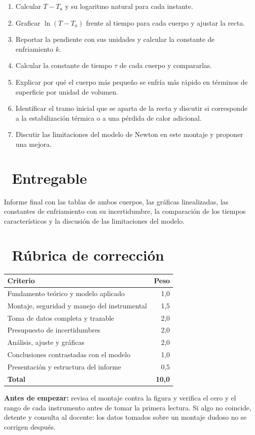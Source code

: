 \documentclass[11pt,a4paper]{article}
\newcommand{\iconotexto}[2]{\textcolor{cyanNeon}{\faIcon{#1}}~#2}
\begin{document}
\begin{enumerate}[leftmargin=1.4em,itemsep=2pt,topsep=3pt]
  \item Calcular $T - T_a$ y su logaritmo natural para cada instante.
  \item Graficar $\ln(T-T_a)$ frente al tiempo para cada cuerpo y ajustar la recta.
  \item Reportar la pendiente con sus unidades y calcular la constante de enfriamiento $k$.
  \item Calcular la constante de tiempo $\tau$ de cada cuerpo y compararlas.
  \item Explicar por qué el cuerpo más pequeño se enfría más rápido en términos de superficie por unidad de volumen.
  \item Identificar el tramo inicial que se aparta de la recta y discutir si corresponde a la estabilización térmica o a una pérdida de calor adicional.
  \item Discutir las limitaciones del modelo de Newton en este montaje y proponer una mejora.
\end{enumerate}

\section{\iconotexto{box-open}{Entregable}}

Informe final con las tablas de ambos cuerpos, las gráficas linealizadas, las constantes de enfriamiento con su incertidumbre, la comparación de los tiempos característicos y la discusión de las limitaciones del modelo.

\section{\iconotexto{ruler-combined}{Rúbrica de corrección}}

\begin{tabularx}{\linewidth}{@{}X r@{}}
\toprule
Criterio & Peso\\
\midrule
Fundamento teórico y modelo aplicado & 1,0 \\
Montaje, seguridad y manejo del instrumental & 1,5 \\
Toma de datos completa y trazable & 2,0 \\
Presupuesto de incertidumbres & 2,0 \\
Análisis, ajuste y gráficas & 2,0 \\
Conclusiones contrastadas con el modelo & 1,0 \\
Presentación y estructura del informe & 0,5 \\
\midrule
\textbf{Total} & \textbf{10,0}\\
\bottomrule
\end{tabularx}

\begin{tcolorbox}[cajaMejora]\textbf{Antes de empezar:} revisa el montaje contra la figura y verifica el cero y el rango de cada instrumento antes de tomar la primera lectura. Si algo no coincide, detente y consulta al docente: los datos tomados sobre un montaje dudoso no se corrigen después.
\end{tcolorbox}
\end{document}
